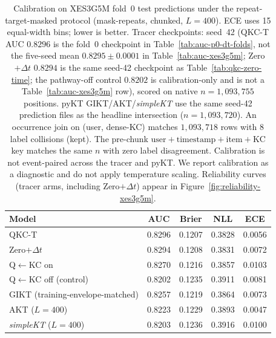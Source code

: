 \begin{table}[tbp]
\caption{Calibration on XES3G5M fold~0 test predictions under the
repeat-target-masked protocol (mask-repeats, chunked, $L{=}400$). ECE uses 15 equal-width bins;
lower is better. Tracer checkpoints: seed~42 (QKC-T AUC $0.8296$ is the fold~0
checkpoint in Table~\ref{tab:auc-p0-dt-folds}, not the five-seed mean
$0.8295{\pm}0.0001$ in Table~\ref{tab:auc-xes3g5m}; Zero$+\Delta t$ $0.8294$ is the same seed-42
checkpoint as Table~\ref{tab:qkc-zero-time}; the pathway-off control $0.8202$ is
calibration-only and is not a Table~\ref{tab:auc-xes3g5m} row),
scored on native $n{=}1{,}093{,}755$ positions. pyKT GIKT/AKT/\textit{simpleKT}
use the same seed-42 prediction files as the headline intersection
($n{=}1{,}093{,}720$). An occurrence join on (user, dense-KC) matches
$1{,}093{,}718$ rows with $8$ label collisions (kept). The pre-chunk
$\mathrm{user}{+}\mathrm{timestamp}{+}\mathrm{item}{+}\mathrm{KC}$ key
matches the same $n$ with zero label disagreement.
Calibration is not event-paired
across the tracer and pyKT. We report
calibration as a diagnostic and do not apply temperature scaling.
Reliability curves (tracer arms, including Zero$+\Delta t$) appear in
Figure~\ref{fig:reliability-xes3g5m}.}
\label{tab:calibration-xes3g5m}
\centering
\footnotesize
\begin{tabular}{@{}lcccc@{}}
\toprule
Model & AUC & Brier & NLL & ECE \\
\midrule
QKC-T & 0.8296 & 0.1207 & 0.3828 & 0.0056 \\
Zero$+\Delta t$ & 0.8294 & 0.1208 & 0.3831 & 0.0072 \\
Q$\leftarrow$KC on & 0.8270 & 0.1216 & 0.3857 & 0.0103 \\
Q$\leftarrow$KC off (control) & 0.8202 & 0.1235 & 0.3911 & 0.0081 \\
GIKT (training-envelope-matched) & 0.8257 & 0.1219 & 0.3864 & 0.0073 \\
AKT ($L{=}400$) & 0.8223 & 0.1229 & 0.3893 & 0.0047 \\
\textit{simpleKT} ($L{=}400$) & 0.8203 & 0.1236 & 0.3916 & 0.0100 \\
\bottomrule
\end{tabular}
\end{table}
